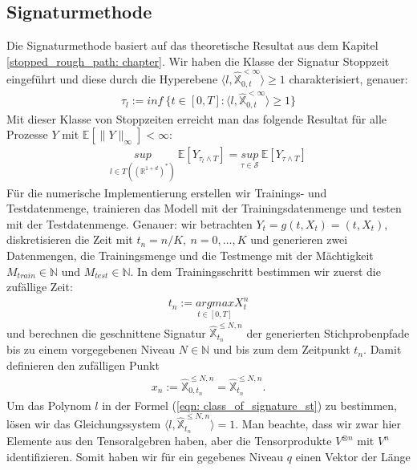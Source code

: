 \documentclass[12pt,titlepage,headsepline]{article}
\begin{document}
      \subsection{Signaturmethode}
      Die Signaturmethode basiert auf das theoretische Resultat aus dem Kapitel \ref{stopped_rough_path: chapter}. Wir haben die Klasse der Signatur Stoppzeit eingeführt und diese durch die Hyperebene $\langle l,\hat{\mathbb{X}}^{<\infty}_{0,t}\rangle \geq 1$ charakterisiert, genauer:
      \begin{align}\label{eqn: class_of_signature_st}
        \tau_l := inf \ \bigg\{ t \in [0,T] : \langle l,\hat{\mathbb{X}}^{<\infty}_{0,t}\rangle \geq 1 \bigg\}
      \end{align}
      Mit dieser Klasse von Stoppzeiten erreicht man das folgende Resultat für alle Prozesse $Y$ mit $\mathbb{E}[\lVert Y\rVert_{\infty}] < \infty $:
      \begin{align*}
          \underset{l \in T((\mathbb{R}^{1+d})^*)}{sup} \ \mathbb{E}[Y_{\tau_l \land T}] = \underset{\tau \in \mathcal{S}}{sup} \ \mathbb{E}[Y_{\tau \land T}]
      \end{align*}
      \hfill\break
      Für die numerische Implementierung erstellen wir Trainings- und Testdatenmenge, trainieren das Modell mit der Trainingsdatenmenge und testen mit der Testdatenmenge. Genauer: wir betrachten $Y_t = g(t,X_t) = (t,X_t)$, diskretisieren die Zeit mit $t_n = n/K, \ n=0,\ldots,K$ und generieren zwei Datenmengen, die Trainingsmenge und die Testmenge mit der Mächtigkeit $M_{train} \in \mathbb{N}$ und $M_{test} \in \mathbb{N}$. In dem Trainingsschritt bestimmen wir zuerst die zufällige Zeit:
      \begin{align*}
        t_n := \underset{t \in [0,T]}{argmax}X_t^{n}
      \end{align*}
      und berechnen die geschnittene Signatur $\hat{\mathbb{X}}_{t_n}^{\leq N,n}$ der generierten Stichprobenpfade bis zu einem vorgegebenen Niveau $N\in \mathbb{N}$ und bis zum dem Zeitpunkt $t_n$. Damit definieren den zufälligen Punkt
      \begin{align*}
        x_n := \hat{\mathbb{X}}_{0,t_n}^{\leq N,n} = \hat{\mathbb{X}}_{t_n}^{\leq N,n}.
      \end{align*}
      Um das Polynom $l$ in der Formel (\ref{eqn: class_of_signature_st}) zu bestimmen, lösen wir das Gleichungssystem $\langle l,\hat{\mathbb{X}}_{t_n}^{\leq N,n}\rangle = 1$. Man beachte, dass wir zwar hier Elemente aus den Tensoralgebren haben, aber die Tensorprodukte $V^{\otimes n}$ mit $V^{n}$ identifizieren. Somit haben wir für ein gegebenes Niveau $q$ einen Vektor der Länge
\end{document}
